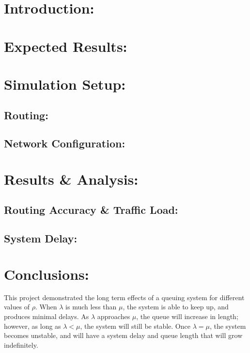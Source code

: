 \documentclass{article}
\begin{document}

\section{Introduction:}
\label{sec:Intro}


\section{Expected Results:}
\label{sec:ExpectedResults}


\section{Simulation Setup:}
\label{sec:SimSetup}


\subsection{Routing:}
\label{subsec:Routing}


\subsection{Network Configuration:}  
\label{subsec:Config}


\section{Results \& Analysis:}
\label{sec:Results}


\subsection{Routing Accuracy \& Traffic Load:}
\label{subsec:Routing}


\subsection{System Delay:}
\label{subsec:SysDelay}




\section{Conclusions:}
\label{sec:Conclusions}

This project demonstrated the long term effects of a queuing system for different values of $\rho$.  
When $\lambda$ is much less than $\mu$, the system is able to keep up, and produces minimal delays.  
As $\lambda$ approaches $\mu$, the queue will increase in length; however, as long as $\lambda < \mu$, the system will still be stable.
Once $\lambda = \mu$, the system becomes unstable, and will have a system delay and queue length that will grow indefinitely.
\end{document}
